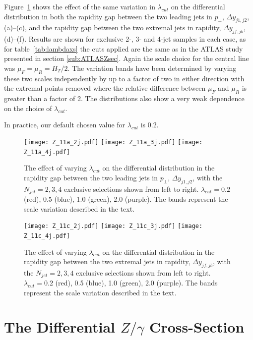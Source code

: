	Figure~\ref{fig:lambdadist} shows the effect of the same variation in $\lambda_{cut}$ on the
	differential distribution in both the rapidity gap between the two leading jets in $p_\perp$,
	$\Delta y_{j1, j2}$, (a)--(c), and the rapidity gap between the two extremal jets in
	rapidity, $\Delta y_{jf, jb}$, (d)--(f).  Results are shown for exclusive 2-, 3-
	and 4-jet samples in each case, as for table~\ref{tab:lambdaxs} the cuts applied are the
	same as in the ATLAS study presented in section \ref{sub:ATLASZsec}.
	Again the scale choice for the central line was $\mu_F=\mu_R=H_T/2$.  The variation bands
	have been determined by varying these two scales independently by up to a factor of two
	in either direction with the extremal points removed where the relative difference between
	$\mu_F$ and $\mu_R$ is greater than a factor of 2.  The distributions also show a very weak
	dependence on the choice of $\lambda_{cut}$.

	In practice, our default chosen value for $\lambda_{cut}$ is 0.2.

	\begin{figure}[htp!]
		\centering
		\texttt{[image: Z\_11a\_2j.pdf]}\hfill
		\texttt{[image: Z\_11a\_3j.pdf]}\hfill
		\texttt{[image: Z\_11a\_4j.pdf]}
		\caption{The effect of varying $\lambda_{cut}$ on the differential distribution
		in the rapidity gap between the two leading jets in $p_\perp$, $\Delta y_{j1, j2}$,
		with the $N_{jet}=2,3,4$ exclusive selections shown from left to right.
		$\lambda_{cut}=0.2$ (red), 0.5 (blue), 1.0 (green), 2.0 (purple).
		The bands represent the scale variation described in the text.}
		\label{fig:lambdadist}
	\end{figure}

	\begin{figure}[htp!]
		\centering
		\texttt{[image: Z\_11c\_2j.pdf]}\hfill
		\texttt{[image: Z\_11c\_3j.pdf]}\hfill
		\texttt{[image: Z\_11c\_4j.pdf]}
		\caption{The effect of varying $\lambda_{cut}$ on the differential distribution
		in the rapidity gap between the two extremal jets in rapidity, $\Delta y_{jf, jb}$,
		with the $N_{jet}=2,3,4$ exclusive selections shown from left to right.
		$\lambda_{cut}=0.2$ (red), 0.5 (blue), 1.0 (green), 2.0 (purple).
		The bands represent the scale variation described in the text.}
		\label{fig:lambdadistdy}
	\end{figure}

\section{The Differential ${Z/\gamma}$ Cross-Section}

